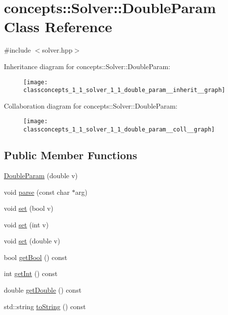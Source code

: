 \hypertarget{classconcepts_1_1_solver_1_1_double_param}{}\section{concepts\+:\+:Solver\+:\+:Double\+Param Class Reference}
\label{classconcepts_1_1_solver_1_1_double_param}


{\ttfamily \#include $<$solver.\+hpp$>$}



Inheritance diagram for concepts\+:\+:Solver\+:\+:Double\+Param\+:\nopagebreak
\begin{figure}[H]
\begin{center}
\leavevmode
\texttt{[image: classconcepts\_1\_1\_solver\_1\_1\_double\_param\_\_inherit\_\_graph]}
\end{center}
\end{figure}


Collaboration diagram for concepts\+:\+:Solver\+:\+:Double\+Param\+:\nopagebreak
\begin{figure}[H]
\begin{center}
\leavevmode
\texttt{[image: classconcepts\_1\_1\_solver\_1\_1\_double\_param\_\_coll\_\_graph]}
\end{center}
\end{figure}
\subsection*{Public Member Functions}
\begin{DoxyCompactItemize}
\item 
\hyperlink{classconcepts_1_1_solver_1_1_double_param_a4f432bf3bd5872439e9d04245f016608}{Double\+Param} (double v)
\item 
void \hyperlink{classconcepts_1_1_solver_1_1_double_param_a9d9cf1f190f8e7b7c4840f0d44fefa1b}{parse} (const char $\ast$arg)
\item 
void \hyperlink{classconcepts_1_1_solver_1_1_double_param_a006e726301f821c96edb00b4ca2ea345}{set} (bool v)
\item 
void \hyperlink{classconcepts_1_1_solver_1_1_double_param_a4648d672a792ded79977319d968fd497}{set} (int v)
\item 
void \hyperlink{classconcepts_1_1_solver_1_1_double_param_a5a27e7e058121b520d71472e8de549db}{set} (double v)
\item 
bool \hyperlink{classconcepts_1_1_solver_1_1_double_param_a59c7fa9b821c071f13d6182d6b525473}{get\+Bool} () const
\item 
int \hyperlink{classconcepts_1_1_solver_1_1_double_param_a19c83a217a6b73891548850869e9c230}{get\+Int} () const
\item 
double \hyperlink{classconcepts_1_1_solver_1_1_double_param_a39d5bb1d5b33ef84c8c015b977b438d9}{get\+Double} () const
\item 
std\+::string \hyperlink{classconcepts_1_1_solver_1_1_double_param_a536f65af0681a1e3af0e101f952f717c}{to\+String} () const
\end{DoxyCompactItemize}
